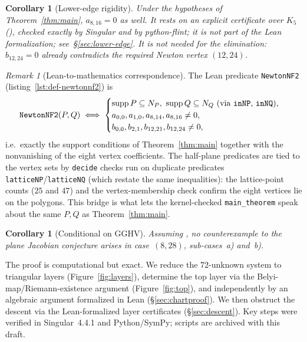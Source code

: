 \documentclass[a4paper,11pt]{article}
\newcommand{\filename}[1]{\texttt{\seqsplit{#1}}}
\theoremstyle{plain}
\newtheorem{corollary}[theorem]{Corollary}
\theoremstyle{definition}
\theoremstyle{remark}
\newtheorem{remark}[theorem]{Remark}
\begin{document}
\begin{corollary}[Lower-edge rigidity]\label{cor:a816}
Under the hypotheses of Theorem~\ref{thm:main}, $a_{8,16}=0$ as well.
It rests on an explicit certificate over $K_5$ (\filename{scripts/a816\_certificate/}),
checked exactly by {\sc Singular} and by python-flint; it is not part of the Lean formalization;
see~\S\ref{sec:lower-edge}. It is not needed for the elimination: $b_{12,24}=0$
already contradicts the required Newton vertex $(12,24)$.
\end{corollary}

\begin{remark}[Lean-to-mathematics correspondence]\label{rem:nf2-bridge}
The Lean predicate \texttt{NewtonNF2} (listing~\ref{lst:def-newtonnf2}) is
\[
\texttt{NewtonNF2}(P,Q)\iff
\begin{cases}
\operatorname{supp}P\subseteq N_P,\ \operatorname{supp}Q\subseteq N_Q
\text{ (via \texttt{inNP}, \texttt{inNQ}),}\\
a_{0,0},a_{1,0},a_{8,14},a_{8,16}\neq0,\\
b_{0,0},b_{2,1},b_{12,21},b_{12,24}\neq0,
\end{cases}
\]
i.e.\ exactly the support conditions of Theorem~\ref{thm:main} together with the nonvanishing of the eight vertex coefficients. The half-plane predicates are tied to the vertex sets by \texttt{decide} checks run on duplicate predicates \texttt{latticeNP}/\texttt{latticeNQ} (which restate the same inequalities): the lattice-point counts ($25$ and $47$) and the vertex-membership check confirm the eight vertices lie on the polygons. This bridge is what lets the kernel-checked \texttt{main\_theorem} speak about the same $P,Q$ as Theorem~\ref{thm:main}.
\end{remark}

\begin{corollary}[Conditional on GGHV]\label{cor:gghv}
Assuming \cite[Prop.~4.3]{GGHV}, no counterexample to the plane Jacobian conjecture arises in case~$(8,28)$, sub-cases~a) and~b).
\end{corollary}

The proof is computational but exact. We reduce the $72$-unknown system to triangular layers (Figure~\ref{fig:layers}), determine the top layer via the Belyi-map/Riemann-existence argument (Figure~\ref{fig:top}), and independently by an algebraic argument formalized in Lean (\S\ref{sec:chartproof}). We then obstruct the descent via the Lean-formalized layer certificates (\S\ref{sec:descent}). Key steps were verified in {\sc Singular}~4.4.1 and Python/{\sc SymPy}; scripts are archived with this draft.
\end{document}
